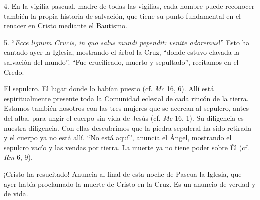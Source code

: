 			\begin{body}4. En la vigilia pascual, madre de todas las vigilias, cada hombre puede reconocer también la propia historia de salvación, que tiene su punto fundamental en el renacer en Cristo mediante el Bautismo.\end{body}
			
			\begin{body}\begin{bodysmall}\end{bodysmall}\end{body}
			
			\begin{body}5. “\textit{Ecce lignum Crucis, in quo salus mundi pependit: venite adoremus}!” Esto ha cantado ayer la Iglesia, mostrando el árbol la Cruz, “donde estuvo clavada la salvación del mundo”. “Fue crucificado, muerto y sepultado”, recitamos en el Credo.\end{body}
			
			\begin{body}El sepulcro. El lugar donde lo habían puesto (cf. \textit{Mc} 16, 6). Allí está espiritualmente presente toda la Comunidad eclesial de cada rincón de la tierra. Estamos también nosotros con las tres mujeres que se acercan al sepulcro, antes del alba, para ungir el cuerpo sin vida de Jesús (cf. \textit{Mc} 16, 1). Su diligencia es nuestra diligencia. Con ellas descubrimos que la piedra sepulcral ha sido retirada y el cuerpo ya no está allí. “No está aquí”, anuncia el Ángel, mostrando el sepulcro vacío y las vendas por tierra. La muerte ya no tiene poder sobre Él (cf. \textit{Rm} 6, 9).\end{body}
			
			\begin{body}¡Cristo ha resucitado! Anuncia al final de esta noche de Pascua la Iglesia, que ayer había proclamado la muerte de Cristo en la Cruz. Es un anuncio de verdad y de vida.\end{body}
			
